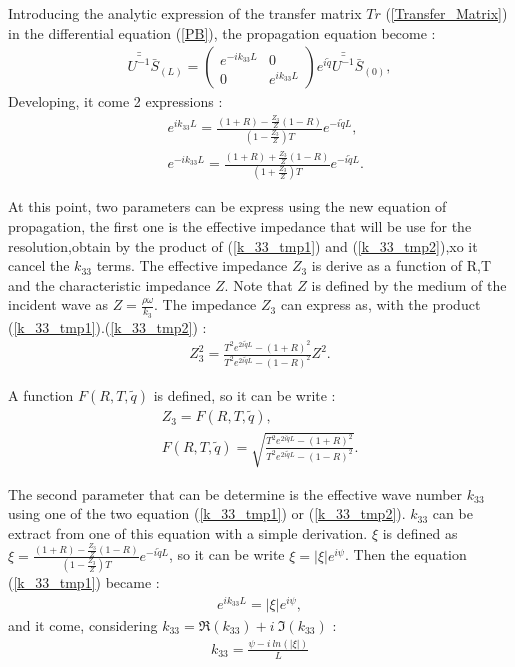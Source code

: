\documentclass{article}
\begin{document}
    Introducing the analytic expression of the transfer matrix $Tr$ (\ref{Transfer_Matrix}) in the differential equation (\ref{PB}), the propagation equation become :
    \begin{align}
    \bar{\bar{U^{-1}}} \bar{S}_{(L)}= \begin{pmatrix}
                                   			e^{-ik_{33}L} & 0 \\ 0 & e^{ik_{33}L}
                                            \end{pmatrix}e^{i\tilde{q}} \bar{\bar{U^{-1}}} \bar{S}_{(0)}, 
   \end{align} 
    Developing, it come 2 expressions  :
    \begin{align}
	&e^{i k_{33}L}=\frac{(1+R)-\frac{Z_3}{Z}(1-R)}{(1-\frac{Z_3}{Z})T}e^{-i\tilde{q}L},\label{k_33_tmp1}\\
    &e^{-i k_{33}L}=\frac{(1+R)+\frac{Z_3}{Z}(1-R)}{(1+\frac{Z_3}{Z})T}e^{-i\tilde{q}L}.\label{k_33_tmp2}
    \end{align} 

    At this point, two parameters can be express using the new equation of propagation, the first one  is the effective impedance that will be use for the resolution,obtain by the product of (\ref{k_33_tmp1}) and (\ref{k_33_tmp2}),xo it cancel the $k_{33}$ terms. The effective impedance $Z_3$ is derive as a function of R,T and the characteristic impedance $Z$. Note that $Z$ is defined by the medium of the incident wave as $Z=\frac{\rho \omega}{k_3}$.
    The impedance $Z_3$ can express as, with the product (\ref{k_33_tmp1}).(\ref{k_33_tmp2}) :
    \begin{align}
    Z_3^2=\frac{T^2e^{2i\tilde{q}L}-(1+R)^2}{T^2e^{2i\tilde{q}L}-(1-R)^2}Z^2\label{Z3}.
    \end{align}
    
    A function $F(R,T,\tilde{q})$ is defined, so it can be write :
    \begin{align}
        Z_3=F(R,T,\tilde{q}),\\
        F(R,T,\tilde{q})=\sqrt{\frac{T^2e^{2i\tilde{q}L}-(1+R)^2}{T^2e^{2i\tilde{q}L}-(1-R)^2}}.
    \end{align}
    
    The second parameter that can be determine is the effective wave number $k_{33}$ using one of the two equation (\ref{k_33_tmp1}) or (\ref{k_33_tmp2}).
    $k_{33}$ can be extract from one of this equation with a simple derivation. $\xi$ is defined as $\xi=\frac{(1+R)-\frac{Z_3}{Z}(1-R)}{(1-\frac{Z_3}{Z})T}e^{-i\tilde{q}L}$, so it can be write $\xi=|\xi|e^{i\psi}$. Then the equation (\ref{k_33_tmp1}) became :
    \begin{align}
	e^{i k_{33}L}=|\xi|e^{i\psi},
    \end{align}
    and it come, considering $k_{33}=\Re(k_{33})+i\ \Im(k_{33})$ :
    \begin{align}
        k_{33}=\frac{\psi-i\ ln(|\xi|)}{L}
    \end{align}
    
\end{document}
